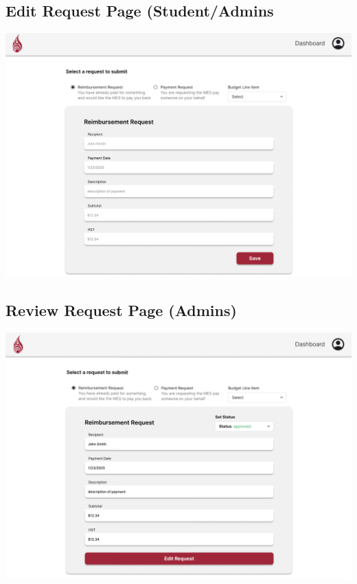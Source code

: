 \documentclass[12pt, titlepage]{article}
\begin{document}
\subsection{Edit Request Page (Student/Admins}
\includegraphics[]{imgs/EditRequestPage.png}

\subsection{Review Request Page (Admins)}
\includegraphics[]{imgs/ReviewRequestAdmins.png}
\end{document}
